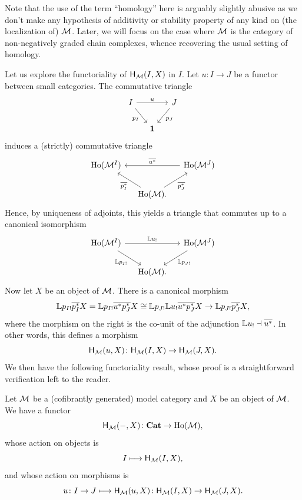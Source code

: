 \begin{remark}
  Note that the use of the term ``homology'' here is arguably slightly
  abusive as we don't make any hypothesis of additivity or stability
  property of any kind on (the localization of) $\mathcal{M}$. Later, we will
  focus on the case where $\mathcal{M}$ is the category of non-negatively
  graded chain complexes, whence recovering the usual setting of homology.
\end{remark}
\begin{paragr}
 Let us explore the functoriality of $\mathsf{H}_{\mathcal{M}}(I,X)$ in $I$. Let
  $u \colon I \to J$ be a functor between small categories. The
  commutative triangle
  \[
    \begin{tikzcd}[column sep=small]
      I \ar[rr,"u"]\ar[rd,"p_I"'] && J\ar[ld,"p_J"] \\
      &\Term&
    \end{tikzcd}
  \]
  induces a (strictly) commutative triangle
  \[
    \begin{tikzcd}[column sep=small]
      \Loc{\fun{I}{\M}}  && \Loc{\fun{J}{\M}}\ar[ll,"\GZ{u^*}"'] \\
      &\Loc{\M}.\ar[lu,"\GZ{p_I^*}"]\ar[ru,"\GZ{p_J^*}"']&
    \end{tikzcd}
  \]
  Hence, by uniqueness of adjoints, this yields a triangle that commutes
  up to a canonical isomorphism
  \[
        \begin{tikzcd}[column sep=small]
      \Loc{\fun{I}{\M}} \ar[rr,"\LL u_!"]\ar[rd,"\LL p_{I!}"'] &&
      \Loc{\fun{J}{\M}}\ar[ld,"\LL p_{J!}"] \\
      &\Loc{\M}.&
    \end{tikzcd}
  \]
  Now let $X$ be an object of $\mathcal{M}$. There is a canonical morphism
  \[
    \mathbb{L} p_{I!}\overline{p_I^*}X =\mathbb{L} p_{I!}\overline{u^*p_J^*}X \cong \mathbb{L} p_{J!} \mathbb{L} u_! \overline{u^*p_J^*}X\to \mathbb{L} p_{J!}\overline{p_J^*}X,
  \]
  where the morphism on the right is the co-unit of the adjunction
  $\mathbb{L} u_! \dashv \overline{u^*}$. In other words, this defines a morphism
  \[
  \mathsf{H}_{\mathcal{M}}(u,X)\colon  \mathsf{H}_{\mathcal{M}}(I,X)\to \mathsf{H}_{\mathcal{M}}(J,X).
  \]
  We then have the following functoriality result, whose proof is a
  straightforward verification left to the reader.
\end{paragr}
\begin{proposition}\label{prop:functorialityhomology}
  Let $\mathcal{M}$ be a (cofibrantly generated) model category and $X$ be an
  object of $\mathcal{M}$. We have a functor
  \[
    \mathsf{H}_{\mathcal{M}}(-,X) \colon \mathbf{Cat} \to \mathrm{Ho}(\mathcal{M}),
  \]
  whose action on objects is
  \[
    I \longmapsto \mathsf{H}_{\mathcal{M}}(I,X),
  \]
  and whose action on morphisms is
  \[
    u \colon I \to J \longmapsto \mathsf{H}_{\mathcal{M}}(u,X) \colon
    \mathsf{H}_{\mathcal{M}}(I,X) \to \mathsf{H}_{\mathcal{M}}(J,X).
  \]
\end{proposition}
